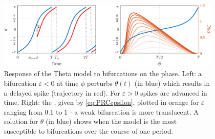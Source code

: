 \begin{figure}[H]
\centering
\includegraphics[width = \textwidth]{../Figures/ThetaNeuronPRC.pdf}
\caption{Response of the Theta model to bifurcations on the phase. Left: a bifurcation $\varepsilon < 0$ at time $\phi$ perturbs $\theta(t)$ (in blue) which results in a delayed spike (trajectory in red). For $\varepsilon > 0$ spikes are advanced in time. Right: the \PRC, given by \eqref{eq:PRCepsilon}, plotted in orange for $\varepsilon$ ranging from 0.1 to 1 - a weak bifurcation is more translucent. A solution for $\theta$ (in blue) shows when the model is the most susceptible to bifurcations over the course of one period.}
\label{fig:ThetaNeuronPRC}
\end{figure}


